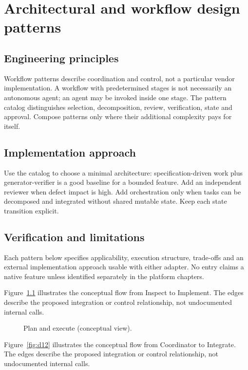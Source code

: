 \chapter{Architectural and workflow design patterns}

\section{Engineering principles}

Workflow patterns describe coordination and control, not a particular vendor implementation. A workflow with predetermined stages is not necessarily an autonomous agent; an agent may be invoked inside one stage. The pattern catalog distinguishes selection, decomposition, review, verification, state and approval. Compose patterns only where their additional complexity pays for itself.

\section{Implementation approach}

Use the catalog to choose a minimal architecture: specification-driven work plus generator-verifier is a good baseline for a bounded feature. Add an independent reviewer when defect impact is high. Add orchestration only when tasks can be decomposed and integrated without shared mutable state. Keep each state transition explicit.

\section{Verification and limitations}

Each pattern below specifies applicability, execution structure, trade-offs and an external implementation approach usable with either adapter. No entry claims a native feature unless identified separately in the platform chapters.

Figure~\ref{fig:d11} illustrates the conceptual flow from Inspect to Implement. The edges describe the proposed integration or control relationship, not undocumented internal calls.

\begin{figure}[htbp]\centering\caption{Plan and execute (conceptual view).}\label{fig:d11}\end{figure}

Figure~\ref{fig:d12} illustrates the conceptual flow from Coordinator to Integrate. The edges describe the proposed integration or control relationship, not undocumented internal calls.


